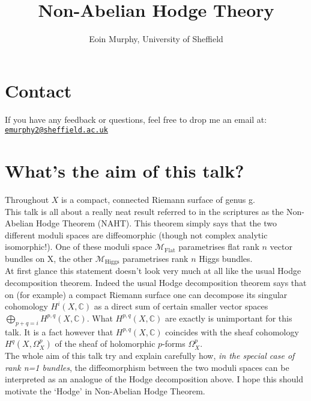% 


\title{Non-Abelian Hodge Theory}
\author{Eoin Murphy, University of Sheffield}
\date{}

\usepackage{tikz-cd}
\usepackage{hyperref}

\setlength\parindent{0pt}

 
\maketitle

\section{Contact}
If you have any feedback or questions, feel free to drop me an email at: \href{mailto:emurphy2@sheffield.ac.uk}{\texttt{emurphy2@sheffield.ac.uk}}


\section{What's the aim of this talk?}

Throughout $X$ is  a compact, connected Riemann surface of genus g.\\

This talk is all about a really neat result referred to in the scriptures as the Non-Abelian Hodge Theorem (NAHT). This theorem simply says that the two different moduli spaces are diffeomorphic (though not complex analytic isomorphic!). One of these moduli space $\mathcal{M}_{\mathrm{Flat}}$ parametrises flat rank $n$ vector bundles on X, the other  $\mathcal{M}_{\mathrm{Higgs}}$ parametrises rank $n$ Higgs bundles.\\

At first glance this statement doesn't look very much at all like the usual Hodge decomposition theorem. Indeed the usual Hodge decomposition theorem says that on (for example) a compact Riemann surface one can decompose its singular cohomology $H^{i}(X,\mathbb{C})$ as a direct sum of certain smaller vector spaces $\bigoplus_{p+q=i}H^{p,q}(X,\mathbb{C})$. What $H^{p,q}(X,\mathbb{C})$ are exactly is unimportant for this talk. It is a fact however that $H^{p,q}(X,\mathbb{C})$ coincides with the sheaf cohomology $H^{q}(X,\Omega_{X}^{p})$ of the sheaf of holomorphic $p$-forms $\Omega_{X}^{p}$.\\

The whole aim of this talk try and explain carefully how, \textit{in the special case of rank n=1 bundles}, the diffeomorphism between the two moduli spaces can be interpreted as an analogue of the Hodge decomposition above. I hope this should motivate the `Hodge' in Non-Abelian Hodge Theorem.\\

